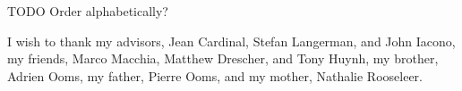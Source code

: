 
TODO Order alphabetically?

I wish to thank
my advisors, Jean Cardinal, Stefan Langerman, and John Iacono,
my friends, Marco Macchia, Matthew Drescher, and Tony Huynh,
my brother, Adrien Ooms,
my father, Pierre Ooms,
and my mother, Nathalie Rooseleer.
